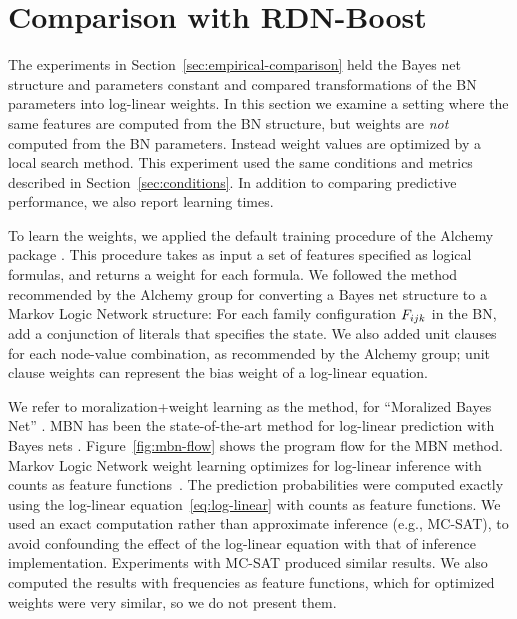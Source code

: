 \documentclass[runningheads,a4paper]{llncs}
\begin{document}
\section{Comparison with RDN-Boost}
\label{sec:general-weights}

The experiments in Section~\ref{sec:empirical-comparison} held the Bayes net structure and parameters constant and compared transformations of the BN parameters into log-linear weights. In this section we examine a setting where the same features are computed from the BN structure, but weights are {\em not} computed from the BN parameters. Instead weight values are optimized by a local search method. This experiment used the same conditions and metrics described in Section~\ref{sec:conditions}.  In addition to comparing predictive performance, we also report learning times.

To learn the weights, we applied the default training procedure of the Alchemy package \cite{Kok2009a}.  This procedure takes as input a set of features specified as logical formulas, and returns a weight for each formula. We followed the method recommended by the Alchemy group \cite{bib:bayes-convert} for converting a Bayes net structure to a Markov Logic Network structure: For each family configuration $F_{ijk}$ in the BN, add a conjunction of literals that specifies the state. We also added unit clauses for each node-value combination, as recommended by the Alchemy group; unit clause weights can represent the bias weight of a log-linear equation.


We refer to moralization+weight learning as the  method, for ``Moralized Bayes Net''   \cite{Khosravi2010}. 
MBN has been the state-of-the-art method for log-linear prediction with Bayes nets \cite{Schulte2012}. Figure~\ref{fig:mbn-flow} shows the program flow for the MBN method.
Markov Logic Network weight learning optimizes for log-linear inference with counts as feature functions~\cite{Schulte2011}. The prediction probabilities were computed exactly using the log-linear equation~\ref{eq:log-linear} with counts as feature functions. We used an exact computation rather than approximate inference
(e.g., MC-SAT), to avoid confounding the effect of the log-linear equation with that of inference implementation. Experiments with MC-SAT produced similar results. We also computed the results with frequencies as feature functions, which for optimized weights were very similar, so we do not present them. 
\end{document}
